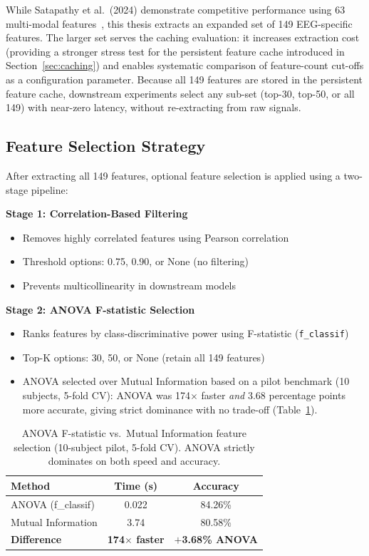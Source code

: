 While Satapathy et al.\ (2024) demonstrate competitive performance using 63 multi-modal features~\cite{satapathy2024multimodal}, this thesis extracts an expanded set of 149 EEG-specific features. The larger set serves the caching evaluation: it increases extraction cost (providing a stronger stress test for the persistent feature cache introduced in Section~\ref{sec:caching}) and enables systematic comparison of feature-count cut-offs as a configuration parameter. Because all 149 features are stored in the persistent feature cache, downstream experiments select any sub-set (top-30, top-50, or all 149) with near-zero latency, without re-extracting from raw signals.

\subsection{Feature Selection Strategy}
\label{sec:feature_selection_strategy}

After extracting all 149 features, optional feature selection is applied using a two-stage pipeline:

\textbf{Stage 1: Correlation-Based Filtering}
\begin{itemize}
\item Removes highly correlated features using Pearson correlation
\item Threshold options: 0.75, 0.90, or None (no filtering)
\item Prevents multicollinearity in downstream models
\end{itemize}

\textbf{Stage 2: ANOVA F-statistic Selection}
\begin{itemize}
\item Ranks features by class-discriminative power using F-statistic (\texttt{f\_classif})
\item Top-K options: 30, 50, or None (retain all 149 features)
\item ANOVA selected over Mutual Information based on a pilot benchmark (10 subjects, 5-fold CV): ANOVA was 174$\times$ faster \textit{and} 3.68 percentage points more accurate, giving strict dominance with no trade-off (Table~\ref{tab:anova_vs_mi}).
\end{itemize}

\begin{table}[htbp]
\centering
\caption[ANOVA vs.\ Mutual Information feature selection comparison]{ANOVA F-statistic vs.\ Mutual Information feature selection
(10-subject pilot, 5-fold CV). ANOVA strictly dominates on both speed and accuracy.}
\label{tab:anova_vs_mi}
\begin{tabular}{lcc}
\toprule
\textbf{Method} & \textbf{Time (s)} & \textbf{Accuracy} \\
\midrule
ANOVA (f\_classif) & 0.022 & 84.26\% \\
Mutual Information & 3.74 & 80.58\% \\
\midrule
\textbf{Difference} & \textbf{174$\times$ faster} & \textbf{$+$3.68\% ANOVA} \\
\bottomrule
\end{tabular}
\end{table}

